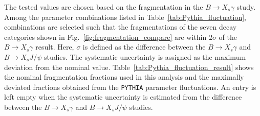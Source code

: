 The tested values are chosen based on the fragmentation in the $B \rightarrow X_{s} \gamma$ study.
Among the parameter combinations listed in Table~\ref{tab:Pythia_fluctuation}, combinations are selected such that the fragmentations of the seven decay categories shown in Fig.~\ref{fig:fragmentation_compare} are within $2\sigma$ of the $B\rightarrow X_{s}\gamma$ result.
Here, $\sigma$ is defined as the difference between the $B \rightarrow X_{s} \gamma$ and $B \rightarrow X_{s} J/\psi$ studies.
The systematic uncertainty is assigned as the maximum deviation from the nominal value.
Table~\ref{tab:Pythia_fluctuation_result} shows the nominal fragmentation fractions used in this analysis and the maximally deviated fractions obtained from the \texttt{PYTHIA} parameter fluctuations.
An entry is left empty when the systematic uncertainty is estimated from the difference between the $B \rightarrow X_{s} \gamma$ and $B \rightarrow X_{s} J/\psi$ studies.
